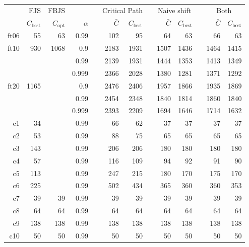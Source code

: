\documentclass[a4paper,11pt]{article}
\begin{document}
\begin{table}
\centering
\scriptsize
\begin{tabular}{@{\bfseries}rrrrrrrrrrrrr}
	\toprule
	& FJS & FBJS & && \multicolumn{2}{c}{Critical Path} &&
	\multicolumn{2}{c}{Naive shift} && \multicolumn{2}{c}{Both} \\
	\cmidrule(lr){2-2} \cmidrule(lr){3-3} \cmidrule(lr){6-7}
	\cmidrule(lr){9-10} \cmidrule(lr){12-13}
	\normalfont{name} & $C_\text{best}$ & $C_\text{opt}$ & $\alpha$ && $\bar{C}$ & $C_\text{best}$ &&
	$\bar{C}$ & $C_\text{best}$ && $\bar{C}$ & $C_\text{best}$ \\
	\midrule
	ft06 &   55 &   63 &  0.99 &&  102 &   95 &&   64 &   63 &&   66 &   63 \\[1ex]
	ft10 &  930 & 1068 &   0.9 && 2183 & 1931 && 1507 & 1436 && 1464 & 1415 \\
	     &      &      &  0.99 && 2139 & 1931 && 1444 & 1353 && 1413 & 1349 \\
	     &      &      & 0.999 && 2366 & 2028 && 1380 & 1281 && 1371 & 1292 \\[1ex]
	ft20 & 1165 &      &   0.9 && 2476 & 2406 && 1957 & 1866 && 1935 & 1869 \\
	     &      &      &  0.99 && 2454 & 2348 && 1840 & 1814 && 1860 & 1840 \\
	     &      &      & 0.999 && 2393 & 2209 && 1694 & 1646 && 1714 & 1632 \\[1ex]
	c1   &   34 &      &  0.99 &&   66 &   62 &&   37 &   37 &&   37 &   37 \\
	c2   &   53 &      &  0.99 &&   88 &   75 &&   65 &   65 &&   65 &   65 \\
	c3   &  143 &      &  0.99 &&  206 &  206 &&  180 &  180 &&  180 &  180 \\
	c4   &   57 &      &  0.99 &&  116 &  109 &&   94 &   92 &&   91 &   90 \\
	c5   &  113 &      &  0.99 &&  247 &  215 &&  180 &  170 &&  175 &  170 \\
	c6   &  225 &      &  0.99 &&  502 &  434 &&  365 &  360 &&  360 &  353 \\
	c7   &   39 &   39 &  0.99 &&   39 &   39 &&   39 &   39 &&   39 &   39 \\
	c8   &   64 &   64 &  0.99 &&   64 &   64 &&   64 &   64 &&   64 &   64 \\
	c9   &  138 &  138 &  0.99 &&  138 &  138 &&  138 &  138 &&  138 &  138 \\
	c10  &   50 &   50 &  0.99 &&   50 &   50 &&   50 &   50 &&   50 &   50 \\

\end{tabular}
\end{table}
\end{document}
